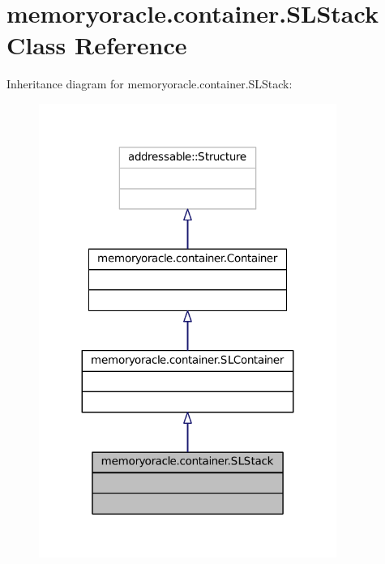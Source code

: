\hypertarget{classmemoryoracle_1_1container_1_1SLStack}{}\section{memoryoracle.\+container.\+S\+L\+Stack Class Reference}
\label{classmemoryoracle_1_1container_1_1SLStack}


Inheritance diagram for memoryoracle.\+container.\+S\+L\+Stack\+:\nopagebreak
\begin{figure}[H]
\begin{center}
\leavevmode
\includegraphics[width=275pt]{classmemoryoracle_1_1container_1_1SLStack__inherit__graph}
\end{center}
\end{figure}


